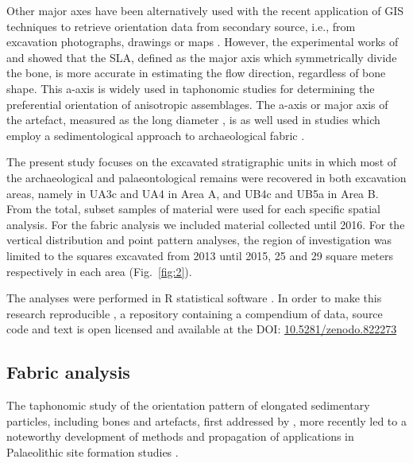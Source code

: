 \documentclass[preprint,authoryear,times]{elsarticle} %
\begin{document}
Other major axes have been alternatively used with the recent application of GIS techniques to retrieve orientation data from secondary source, i.e., from excavation photographs, drawings or maps \citep{Boschian2010,Benito-Calvo2011,Torre2013a,Walter2013,Garcia-Moreno2016,Sanchez-Romero2016}. However, the experimental works of \cite{Dominguez-Rodrigo2013} and \cite{Dominguez-Rodrigo2014} showed that the SLA, defined as the major axis which symmetrically divide the bone, is more accurate in estimating the flow direction, regardless of bone shape. This a-axis is widely used in taphonomic studies \citep[][among others]{Toots1965,Voorhies1969,Eberth2007,Dominguez-Rodrigo2012,Dominguez-Rodrigo2014c,Aramendi2017} for determining the preferential orientation of anisotropic assemblages. The a-axis or major axis of the artefact, measured as the long diameter \citep{Krumbein1941}, is as well used in studies which employ a sedimentological approach to archaeological fabric \citep[][among others]{Bertran1995,Bertran1997,Lenoble2004,Benito-Calvo2009}.

The present study focuses on the excavated stratigraphic units in which most of the archaeological and palaeontological remains were recovered in both excavation areas, namely in UA3c and UA4 in Area A, and UB4c and UB5a in Area B. From the total, subset samples of material were used for each specific spatial analysis. For the fabric analysis we included material collected until 2016. For the vertical distribution and point pattern analyses, the region of investigation was limited to the squares excavated from 2013 until 2015, 25 and 29 square meters respectively in each area (Fig.~\ref{fig:2}).

The analyses were performed in \textsf{R} statistical software \citep{RCoreTeam2017}. In order to make this research reproducible \citep{Marwick2017,Marwick2017a}, a repository containing a compendium of data, source code and text is open licensed and available at the DOI: \href{https://doi.org/10.5281/zenodo.822273}{10.5281/zenodo.822273}

\subsection{Fabric analysis}

The taphonomic study of the orientation pattern of elongated sedimentary particles, including bones and artefacts, first addressed by \cite{Voorhies1969,Isaac1967,Bar-Yosef1972,Schick1986}, more recently led to a noteworthy development of methods and propagation of applications in Palaeolithic site formation studies \citep[][among others]{Bertran1995,Bertran1997,Lenoble2004,Lenoble2008,McPherron2005,Benito-Calvo2009,Benito-Calvo2011a,Benito-Calvo2011,Bernatchez2010,Boschian2010,Dominguez-Rodrigo2012,Dominguez-Rodrigo2013,Dominguez-Rodrigo2014,Torre2013a,Walter2013,Garcia-Moreno2016,Sanchez-Romero2016}.
\end{document}
